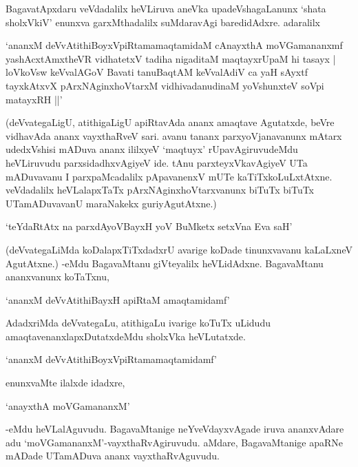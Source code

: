 BagavatApxdaru veVdadalilx heVLiruva aneVka upadeVshagaLanunx `shata sholxVkiV' enunxva garxMthadalilx suMdaravAgi baredidAdxre. adaralilx

\begin{shloka}
`ananxM deVvAtithiBoyxV\s piRtamamaqtamidaM cAnayxthA moVGamananxmf\\
yashAcxtAmxtheVR vidhatetxV tadiha nigaditaM maqtayxrUpaM hi tasayx |\\
loVkoV\s sw keVvalAGoV Bavati tanuBaqtAM keVvalAdiV ca yaH sAyxtf\\
tayxkAtxvX pArxNAginxhoVtarxM vidhivadanudinaM yoV\s shunxteV soV\s pi matayxRH ||'
\end{shloka}

(deVvategaLigU, atithigaLigU apiRtavAda ananx amaqtave Agutatxde, beVre vidhavAda ananx vayxthaRveV sari. avanu tananx parxyoVjanavanunx mAtarx udedxVshisi mADuva ananx ililxyeV `maqtuyx' rUpavAgiruvudeMdu heVLiruvudu parxsidadhxvAgiyeV ide. tAnu parxteyxVkavAgiyeV UTa mADuvavanu I parxpaMcadalilx pApavanenxV mUTe kaTiTxkoLuLxtAtxne. veVdadalilx heVLalapxTaTx pArxNAginxhoVtarxvanunx biTuTx biTuTx UTamADuvavanU maraNakekx guriyAgutAtxne.)

\begin{shloka}
`teYdaRtAtx na parxdAyoVBayxH yoV BuMketx setxVna Eva saH'
\end{shloka}

(deVvategaLiMda koDalapxTiTxdadxrU avarige koDade tinunxvavanu kaLaLxneV AgutAtxne.) -eMdu BagavaMtanu giVteyalilx heVLidAdxne. BagavaMtanu ananxvanunx koTaTxnu,

\begin{shloka}
`ananxM deVvAtithiBayxH apiRtaM amaqtamidamf'
\end{shloka}

AdadxriMda deVvategaLu, atithigaLu ivarige koTuTx uLidudu amaqtavenanxlapxDutatxdeMdu sholxVka heVLutatxde.

\begin{shloka}
`ananxM deVvAtithiBoyxV\s piRtamamaqtamidamf'
\end{shloka}

enunxvaMte ilalxde idadxre,

\begin{shloka}
`anayxthA moVGamananxM'
\end{shloka}

-eMdu heVLalAguvudu. BagavaMtanige neYveVdayxvAgade iruva ananxvAdare adu `moVGamananxM'-vayxthaRvAgiruvudu. aMdare, BagavaMtanige apaRNe mADade UTamADuva ananx vayxthaRvAguvudu.

